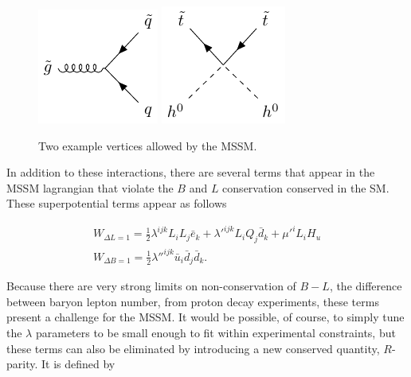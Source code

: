 \begin{centering}
\begin{figure}[!hbt]
\myfloatalign
\includegraphics[width=.45\linewidth]{feynman/gluino.pdf}
\includegraphics[width=.45\linewidth]{feynman/higgs_stop.pdf}
\caption{Two example vertices allowed by the \ac{MSSM}.}
\label{fig:mssm_int}
\end{figure}
\end{centering}

In addition to these interactions, there are several terms that appear in the \ac{MSSM} lagrangian that violate the $B$ and $L$ conservation conserved in the \ac{SM}. These superpotential terms appear as follows

\begin{eqnarray}
W_{\Delta L = 1} = \frac{1}{2}\lambda^{ijk}L_i L_j \bar{e}_k + \lambda'^{ijk}L_i Q_j \bar{d}_k + \mu'^i L_i H_u \\
W_{\Delta B = 1} = \frac{1}{2}\lambda''^{ijk}\bar{u}_i \bar{d}_j \bar{d}_k .
\label{eq:rviol}
\end{eqnarray}

Because there are very strong limits on non-conservation of $B-L$, the difference between baryon lepton number, from proton decay experiments, these terms present a challenge for the \ac{MSSM}. It would be possible, of course, to simply tune the $\lambda$ parameters to be small enough to fit within experimental constraints, but these terms can also be eliminated by introducing a new conserved quantity, $R$-parity. It is defined by

